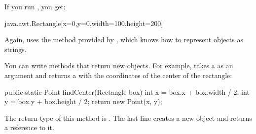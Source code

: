 If you run , you get:

\begin{stdout}
java.awt.Rectangle[x=0,y=0,width=100,height=200]
\end{stdout}

Again,  uses the  method provided by , which knows how to represent  objects as strings.


You can write methods that return new objects.
For example,  takes a  as an argument and returns a  with the coordinates of the center of the rectangle:

\begin{code}
public static Point findCenter(Rectangle box) {
    int x = box.x + box.width / 2;
    int y = box.y + box.height / 2;
    return new Point(x, y);
}
\end{code}

The return type of this method is .
The last line creates a new  object and returns a reference to it.


%
%
%
%
%
%
%

